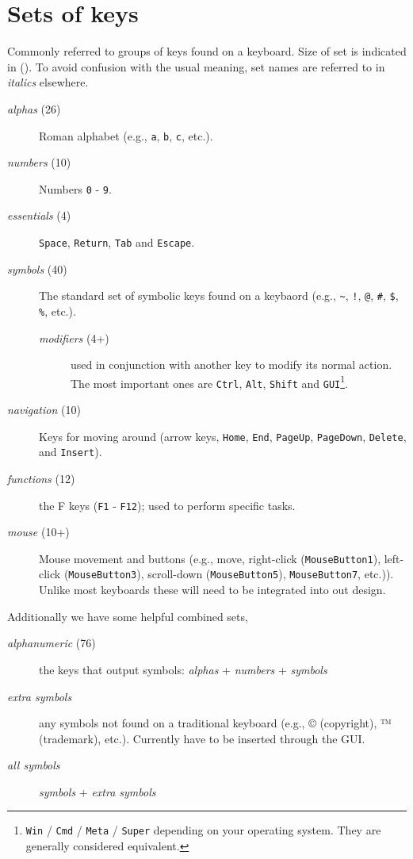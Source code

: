 \documentclass[logo,bsc,singlespacing,parskip]{infthesis}
\begin{document}
\section{Sets of keys}
\label{sec:orgfea3641}
Commonly referred to groups of keys found on a keyboard.
Size of set is indicated in ().
To avoid confusion with the usual meaning, set names are referred to in \emph{italics} elsewhere.

\begin{mdframed}
\begin{description}
\item[{\emph{alphas} (26)}] Roman alphabet (e.g., \texttt{a}, \texttt{b}, \texttt{c}, etc.).
\item[{\emph{numbers} (10)}] Numbers \texttt{0} - \texttt{9}.
\item[{\emph{essentials} (4)}] \texttt{Space}, \texttt{Return}, \texttt{Tab} and \texttt{Escape}.
\item[{\emph{symbols} (40)}] The standard set of symbolic keys found on a keybaord (e.g.,  \texttt{\textasciitilde{}}, \texttt{!}, \texttt{@}, \texttt{\#}, \texttt{\$}, \texttt{\%}, etc.).
\begin{description}
\item[{\emph{modifiers} (4+)}] used in conjunction with another key to modify its normal action. The most important ones are \texttt{Ctrl}, \texttt{Alt}, \texttt{Shift} and \texttt{GUI}\footnote{\texttt{Win} / \texttt{Cmd} / \texttt{Meta} / \texttt{Super} depending on your operating system. They are generally considered equivalent.}.
\end{description}
\item[{\emph{navigation} (10)}] Keys for moving around (arrow keys, \texttt{Home}, \texttt{End}, \texttt{PageUp}, \texttt{PageDown}, \texttt{Delete}, and \texttt{Insert}).
\item[{\emph{functions} (12)}] the F keys (\texttt{F1} - \texttt{F12}); used to perform specific tasks.
\item[{\emph{mouse} (10+)}] Mouse movement and buttons (e.g., move, right-click (\texttt{MouseButton1}), left-click (\texttt{MouseButton3}), scroll-down (\texttt{MouseButton5}), \texttt{MouseButton7}, etc.)).
Unlike most keyboards these will need to be integrated into out design.
\end{description}
Additionally we have some helpful combined sets,
\begin{description}
\item[{\emph{alphanumeric} (76)}] the keys that output symbols: \emph{alphas} + \emph{numbers} + \emph{symbols}
\item[{\emph{extra symbols} }] any symbols not found on a traditional keyboard (e.g., © (copyright), ™ (trademark), etc.).
Currently have to be inserted through the GUI.
\item[{\emph{all symbols}}] \emph{symbols} + \emph{extra symbols}
\end{description}
\end{mdframed}
\end{document}
